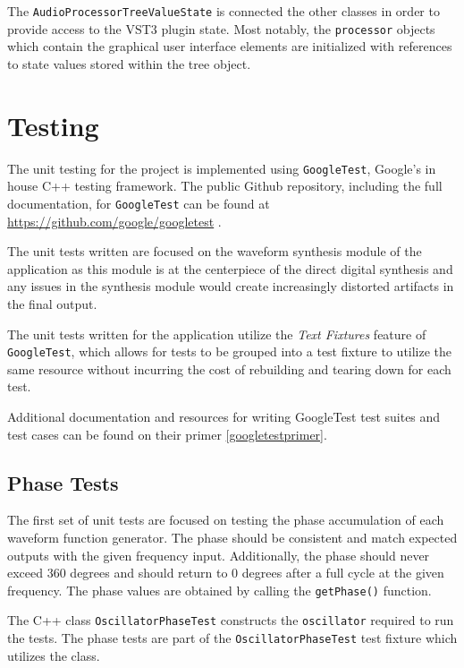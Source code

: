 \documentclass[a4paper,12pt]{report}
\begin{document}
The \texttt{Audio\-Processor\-Tree\-Value\-State} is connected the other classes in order to provide access to the VST3 plugin state. Most notably, the \texttt{processor} objects which contain the graphical user interface elements are initialized with references to state values stored within the tree object.

\section{Testing}
\label{sec:testing}
The unit testing for the project is implemented using \texttt{Google\-Test}, Google's in house C++ testing framework. The public Github repository, including the full documentation, for \texttt{Google\-Test} can be found at \href{https://github.com/google/googletest}{https://github.com/google/googletest} \cite{googletest}.

The unit tests written are focused on the waveform synthesis module of the application as this module is at the centerpiece of the direct digital synthesis and any issues in the synthesis module would create increasingly distorted artifacts in the final output.

The unit tests written for the application utilize the \emph{Text Fixtures} feature of \texttt{Google\-Test}, which allows for tests to be grouped into a test fixture to utilize the same resource without incurring the cost of rebuilding and tearing down for each test. 

Additional documentation and resources for writing GoogleTest test suites and test cases can be found on their primer \ref{googletestprimer}.

\subsection{Phase Tests}
\label{subsec:phasetests}
The first set of unit tests are focused on testing the phase accumulation of each waveform function generator. The phase should be consistent and match expected outputs with the given frequency input. Additionally, the phase should never exceed 360 degrees and should return to 0 degrees after a full cycle at the given frequency. The phase values are obtained by calling the \texttt{getPhase()} function.

The C++ class \texttt{Oscillator\-Phase\-Test} constructs the \texttt{oscillator} required to run the tests. The phase tests are part of the \texttt{Oscillator\-Phase\-Test} test fixture which utilizes the class.
\end{document}
